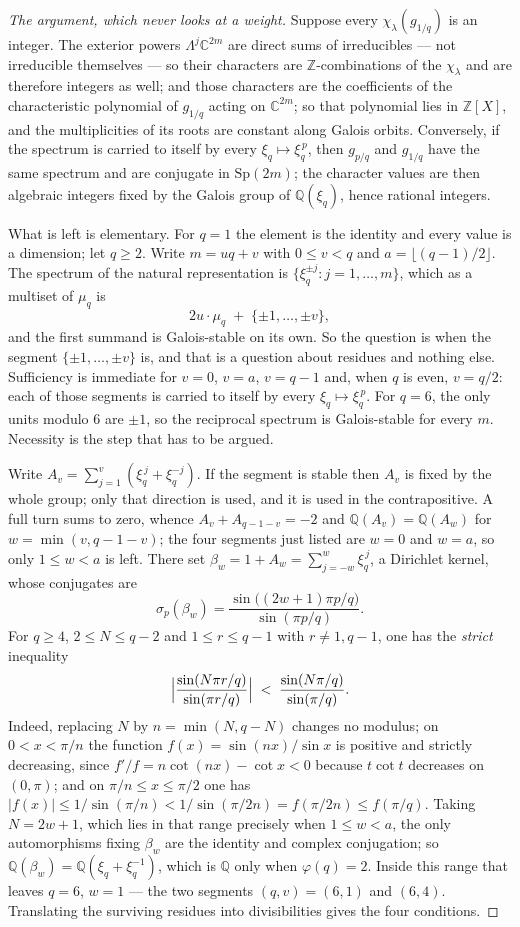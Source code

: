 \documentclass[11pt,a4paper]{article}
\theoremstyle{definition}
\newcommand{\Sp}{\mathrm{Sp}}
\newcommand{\ZZ}{\mathbb{Z}}
\begin{document}
\begin{proof}[The argument, which never looks at a weight]
Suppose every $\chi_\lambda(g_{1/q})$ is an integer. The exterior powers
$\Lambda^j\mathbb{C}^{2m}$ are direct sums of irreducibles --- not irreducible themselves ---
so their characters are
$\ZZ$-combinations of the $\chi_\lambda$ and are therefore integers as well; and those
characters are the coefficients of the characteristic polynomial of $g_{1/q}$ acting on
$\mathbb{C}^{2m}$; so that polynomial lies in $\ZZ[X]$,
and the multiplicities of its roots are constant along Galois orbits. Conversely, if the spectrum is
carried to itself by every $\xi_q\mapsto\xi_q^{\,p}$, then $g_{p/q}$ and $g_{1/q}$ have the same
spectrum and are conjugate in $\Sp(2m)$; the character values are then algebraic integers fixed by
the Galois group of $\mathbb{Q}(\xi_q)$, hence rational integers.

What is left is elementary. For $q=1$ the element is the identity and every value is a dimension; let $q\ge2$. Write $m=uq+v$ with $0\le v<q$ and $a=\lfloor(q-1)/2\rfloor$. The
spectrum of the natural representation is $\{\xi_q^{\pm j}: j=1,\dots,m\}$, which as a multiset of
$\mu_q$ is
\[
2u\cdot\mu_q \;+\;\{\pm1,\dots,\pm v\} ,
\]
and the first summand is Galois-stable on its own. So the question is when the segment
$\{\pm1,\dots,\pm v\}$ is, and that is a question about residues and nothing else. Sufficiency is
immediate for $v=0$, $v=a$, $v=q-1$ and, when $q$ is even, $v=q/2$: each of those segments is
carried to itself by every $\xi_q\mapsto\xi_q^{\,p}$. For $q=6$, the only units modulo $6$ are $\pm1$, so the reciprocal spectrum is Galois-stable for every $m$. Necessity is the step that has to be argued.

Write $A_v=\sum_{j=1}^{v}(\xi_q^{\,j}+\xi_q^{-j})$. If the segment is stable then $A_v$ is fixed by
the whole group; only that direction is used, and it is used in the contrapositive. A full turn sums to zero, whence $A_v+A_{q-1-v}=-2$ and
$\mathbb{Q}(A_v)=\mathbb{Q}(A_w)$ for $w=\min(v,q-1-v)$; the four segments just listed are $w=0$
and $w=a$, so only $1\le w<a$ is left. There set
$\beta_w=1+A_w=\sum_{j=-w}^{w}\xi_q^{\,j}$, a Dirichlet kernel, whose conjugates are
\[
  \sigma_p(\beta_w)=\frac{\sin\bigl((2w+1)\pi p/q\bigr)}{\sin(\pi p/q)} .
\]
For $q\ge4$, $2\le N\le q-2$ and $1\le r\le q-1$ with $r\neq1,q-1$, one has the \emph{strict}
inequality
\[
  \Bigl|\frac{\sin(N\pi r/q)}{\sin(\pi r/q)}\Bigr|
  \;<\;\frac{\sin(N\pi/q)}{\sin(\pi/q)} .
\]
Indeed, replacing $N$ by $n=\min(N,q-N)$ changes no modulus; on $0<x<\pi/n$ the function
$f(x)=\sin(nx)/\sin x$ is positive and strictly decreasing, since $f'/f=n\cot(nx)-\cot x<0$ because
$t\cot t$ decreases on $(0,\pi)$; and on $\pi/n\le x\le\pi/2$ one has
$|f(x)|\le 1/\sin(\pi/n)<1/\sin(\pi/2n)=f(\pi/2n)\le f(\pi/q)$. Taking $N=2w+1$, which lies in that
range precisely when $1\le w<a$, the only automorphisms fixing $\beta_w$ are the identity and
complex conjugation; so $\mathbb{Q}(\beta_w)=\mathbb{Q}(\xi_q+\xi_q^{-1})$, which is $\mathbb{Q}$
only when $\varphi(q)=2$. Inside this range that leaves $q=6$, $w=1$ --- the two segments
$(q,v)=(6,1)$ and $(6,4)$. Translating the surviving residues into divisibilities gives the four
conditions.
\end{proof}
\end{document}
